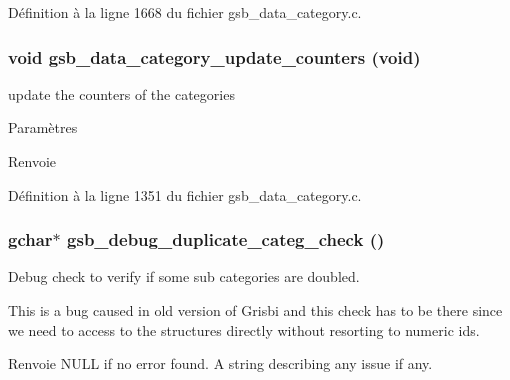 Définition à la ligne 1668 du fichier gsb\_\-data\_\-category.c.

\subsubsection[{gsb\_\-data\_\-category\_\-update\_\-counters}]{\setlength{\rightskip}{0pt plus 5cm}void gsb\_\-data\_\-category\_\-update\_\-counters (void)}\label{gsb__data__category_8c_a7493a6311c8104b85359d4e5845801f5}
update the counters of the categories


\begin{DoxyParams}{Paramètres}
\item[{\em }]\end{DoxyParams}
\begin{DoxyReturn}{Renvoie}

\end{DoxyReturn}


Définition à la ligne 1351 du fichier gsb\_\-data\_\-category.c.

\subsubsection[{gsb\_\-debug\_\-duplicate\_\-categ\_\-check}]{\setlength{\rightskip}{0pt plus 5cm}gchar$\ast$ gsb\_\-debug\_\-duplicate\_\-categ\_\-check ()}\label{gsb__data__category_8c_a77a566f97efc985ed31a709e0f999884}


Debug check to verify if some sub categories are doubled. 

This is a bug caused in old version of Grisbi and this check has to be there since we need to access to the structures directly without resorting to numeric ids.

\begin{DoxyReturn}{Renvoie}
NULL if no error found. A string describing any issue if any. 
\end{DoxyReturn}


